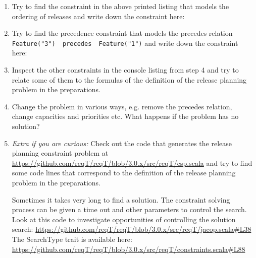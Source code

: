 \documentclass[11pt]{article}
\begin{document}
\begin{framed}
\begin{enumerate}
\begin{lstlisting}
\end{lstlisting}
\item Try to find the constraint in the above printed listing that models the ordering of releases and write down the constraint here:
\vspace{1.5em}
\item Try to find the precedence constraint that models the precedes relation \newline\lstinline+Feature("3")  precedes  Feature("1")+ and write down the constraint here:
\vspace{1.5em}
\item Inspect the other constraints in the console listing from step 4 and try to relate some of them to the formulas of the definition of the release planning problem in the preparations.
\item Change the problem in various ways, e.g. remove the precedes relation, change capacities and priorities etc. What happens if the problem has no solution?
\vspace{1em}
\item {\it Extra if you are curious:} Check out the code that generates the release planning constraint problem at \url{https://github.com/reqT/reqT/blob/3.0.x/src/reqT/csp.scala} and try to find some code lines that correspond to the definition of the release planning problem in the preparations. 

Sometimes it takes very long to find a solution. The constraint solving process can be given a time out and other parameters to control the search. Look at this code to investigate opportunities of controlling the solution search: \url{https://github.com/reqT/reqT/blob/3.0.x/src/reqT/jacop.scala#L38} The SearchType trait is available here: \url{https://github.com/reqT/reqT/blob/3.0.x/src/reqT/constraints.scala#L88} 
\end{enumerate}

\end{framed}
\end{document}
